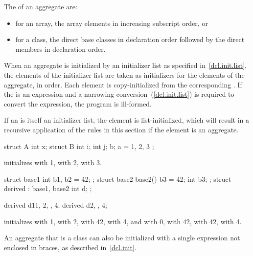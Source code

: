 \pnum
{}%
The  of an aggregate are:
\begin{itemize}
\item
for an array, the array elements in increasing subscript order, or
\item
for a class, the direct base classes in declaration order
followed by the direct members in declaration order.
\end{itemize}

\pnum
When an aggregate is initialized by an initializer list
as specified in~\ref{dcl.init.list},
the elements of the initializer list are taken as initializers
for the elements of the aggregate, in order.
Each element is copy-initialized
from the corresponding .
If the  is an expression and
a narrowing conversion~(\ref{dcl.init.list}) is required
to convert the expression, the program is ill-formed.
\begin{note} If an  is itself an initializer list,
the element is list-initialized, which will result in a recursive application
of the rules in this section if the element is an aggregate. \end{note}
\begin{example}
\begin{codeblock}
struct A {
  int x;
  struct B {
    int i;
    int j;
  } b;
} a = { 1, { 2, 3 } };
\end{codeblock}
initializes
with 1,
with 2,
with 3.

\begin{codeblock}
struct base1 { int b1, b2 = 42; };
struct base2 {
  base2() {
    b3 = 42;
  }
  int b3;
};
struct derived : base1, base2 {
  int d;
};

derived d1{{1, 2}, {}, 4};
derived d2{{}, {}, 4};
\end{codeblock}
initializes
 with 1,
 with 2,
 with 42,
 with 4, and
 with 0,
 with 42,
 with 42,
 with 4.
\end{example}

\pnum
An aggregate that is a class can also be initialized with a single
expression not enclosed in braces, as described in~\ref{dcl.init}.


